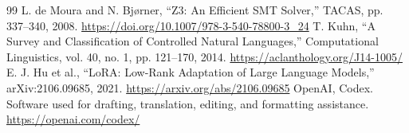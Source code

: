 \documentclass[10pt,a4paper,twocolumn]{article}\usepackage[margin=18mm]{geometry}\usepackage{fontspec,kotex}
\begin{document}
\begin{thebibliography}{99}
 L. de Moura and N. Bjørner, “Z3: An Efficient SMT Solver,” TACAS, pp. 337--340, 2008. \url{https://doi.org/10.1007/978-3-540-78800-3_24}
 T. Kuhn, “A Survey and Classification of Controlled Natural Languages,” Computational Linguistics, vol. 40, no. 1, pp. 121--170, 2014. \url{https://aclanthology.org/J14-1005/}
 E. J. Hu et al., “LoRA: Low-Rank Adaptation of Large Language Models,” arXiv:2106.09685, 2021. \url{https://arxiv.org/abs/2106.09685}
 OpenAI, Codex. Software used for drafting, translation, editing, and formatting assistance. \url{https://openai.com/codex/}
\end{thebibliography}
\end{document}
